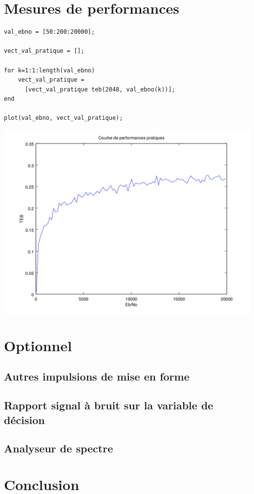 \documentclass{acm_proc_article-sp}
\begin{document}
\section{Mesures de performances}


\begin{center}
\begin{lstlisting}
val_ebno = [50:200:20000];

vect_val_pratique = [];

for k=1:1:length(val_ebno)
    vect_val_pratique = 
      [vect_val_pratique teb(2048, val_ebno(k))];
end

plot(val_ebno, vect_val_pratique);
\end{lstlisting}

\includegraphics[scale=0.45]{performance_prat_8.png}
\end{center}

\section{Optionnel}
\subsection{Autres impulsions de mise en forme}
\subsection{Rapport signal à bruit sur la variable de décision}
\subsection{Analyseur de spectre}


\section{Conclusion}


\nocite{*}

\balancecolumns
\end{document}
